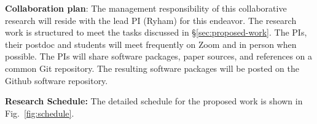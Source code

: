 \medskip

\textbf{Collaboration plan}: 
%
The management responsibility of this collaborative research will reside
with the lead PI (Ryham) for this endeavor. The research work is
structured to meet the tasks discussed in \S\ref{sec:proposed-work}.
%
The PIs, their postdoc and students will meet frequently on Zoom and in
person when possible. The PIs will share software packages, paper
sources, and references on a common \textsf{Git} repository. The
resulting software packages will be posted on the \textsf{Github}
software repository.

\medskip

\textbf{Research Schedule:} The detailed schedule for the proposed work
is shown in Fig.~\ref{fig:schedule}.


